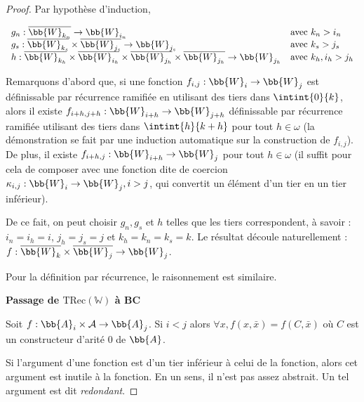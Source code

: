 \documentclass{report}
\newcommand{\TRec}[1]{\text{TRec}\left(\mathbb{#1}\right)}
\begin{document}
\begin{proof}
				Par hypothèse d'induction, 
				
				\[
					\begin{array}{ll}
					g_n : \overline{\bb{W}_{k_n}} \to \bb{W}_{i_n} & \text{avec $k_n > i_n$}\\
					g_s : \overline{\bb{W}_{k_s}} \times \overline{\bb{W}_{j_s}} \to \bb{W}_{j_s} & \text{avec $k_s > j_s$} \\
					h : \overline{\bb{W}_{k_h}} \times \overline{\bb{W}_{i_h}} \times \overline{\bb{W}_{j_h}} \times \overline{\bb{W}_{j_h}} \to \bb{W}_{j_h} & \text{avec $k_h, i_h > j_h$}
					\end{array}
				\]
				
				Remarquons d'abord que, si une fonction $f_{i,j} : \bb{W}_i \to \bb{W}_j$ est définissable par récurrence ramifiée en utilisant des tiers dans $\intint{0}{k}$, alors il existe $f_{i+h, j+h} : \bb{W}_{i+h} \to \bb{W}_{j+h}$ définissable par récurrence ramifiée utilisant des tiers dans $\intint{h}{k+h}$ pour tout $h \in \omega$ (la démonstration se fait par une induction automatique sur la construction de $f_{i,j}$). De plus, il existe $f_{i+h,j} : \bb{W}_{i+h} \to \bb{W}_j$ pour tout $h \in \omega$ (il suffit pour cela de composer avec une fonction dite de coercion $\kappa_{i,j} : \bb{W}_i \to \bb{W}_j, i>j$, qui convertit un élément d'un tier en un tier inférieur).
				
				De ce fait, on peut choisir $g_n, g_s$ et $h$ telles que les tiers correspondent, à savoir : $i_n = i_h = i$, $j_h = j_s = j$ et $k_h = k_n = k_s = k$. Le résultat découle naturellement : $f : \overline{\bb{W}_{k}} \times \overline{\bb{W}_{j}} \to \bb{W}_{j}$.
				
				Pour la définition par récurrence, le raisonnement est similaire. 
				
				\espace
				
				\textbf{Passage de $\TRec{W}$ à $\textbf{BC}$}
				
				\begin{lemma}
					\label{lem:arg_redondant}
					Soit $f : \bb{A}_i \times \mathcal{A} \to \bb{A}_j$. Si $i < j$ alors $\forall x, f(x, \bar{x}) = f(C, \bar{x})$ où $C$ est un constructeur d'arité $0$ de $\bb{A}$.
				\end{lemma}
				
				Si l'argument d'une fonction est d'un tier inférieur à celui de la fonction, alors cet argument est inutile à la fonction. En un sens, il n'est pas assez abstrait. Un tel argument est dit \emph{redondant}.
				

\end{proof}
\end{document}
